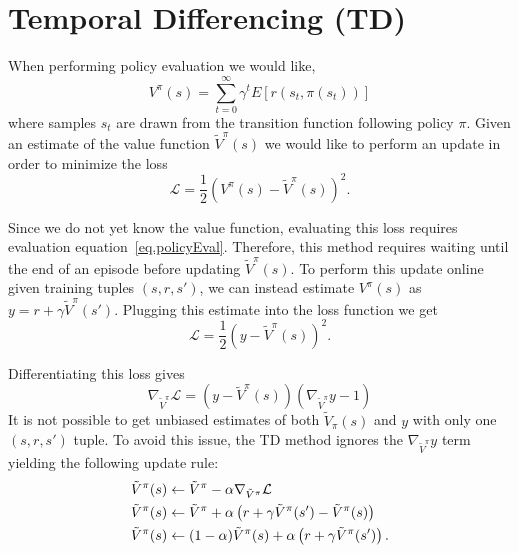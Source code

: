 \documentclass[11pt]{article}
\numberwithin{equation}{section}
\numberwithin{figure}{section}
\begin{document}
\section{Temporal Differencing (TD)}

When performing policy evaluation we would like,
\begin{equation}
	V^\pi(s) = \sum_{t = 0}^\infty \gamma^t E[r(s_t,\pi(s_t))]
	\label{eq.policyEval}
\end{equation}
where samples $s_t$ are drawn from the transition function following policy $\pi$. Given an estimate of the value function $\tilde{V}^\pi(s)$ we would like to perform an update in order to minimize the loss
\begin{equation}
	\mathcal{L} = \frac{1}{2} \left(V^\pi(s) - \tilde{V}^\pi(s) \right)^2.
	\label{eq.valLoss}
\end{equation}

Since we do not yet know the value function, evaluating this loss requires evaluation equation~\ref{eq.policyEval}. Therefore, this method requires waiting until the end of an episode before updating $\tilde{V}^\pi(s)$. To perform this update online given training tuples $(s,r,s')$, we can instead estimate $V^\pi(s)$ as $y = r + \gamma \tilde{V}^\pi(s')$. Plugging this estimate into the loss function we get
\begin{equation}
	\mathcal{L} = \frac{1}{2} \left(y - \tilde{V}^\pi(s) \right)^2.
	\label{eq.valLossApprox}
\end{equation}

Differentiating this loss gives
\begin{equation}
    \nabla_{\tilde{V}^\pi}\mathcal{L} = \left(y - \tilde{V}^\pi(s) \right) \left(\nabla_{\tilde{V}^\pi} y - 1 \right)
    \label{eq.valGrad}
\end{equation}
It is not possible to get unbiased estimates of both $\tilde{V}_\pi(s)$ and $y$ with only one $(s,r,s')$ tuple. To avoid this issue, the TD method ignores the $\nabla_{\tilde{V}^\pi} y$ term yielding the following update rule:
\begin{align}
    \tilde{V}^\pi(s) &\leftarrow  \tilde{V}^\pi - \alpha \nabla_{\tilde{V}^\pi}\mathcal{L} \notag \\
    \tilde{V}^\pi(s) &\leftarrow  \tilde{V}^\pi + \alpha \left(r + \gamma \tilde{V}^\pi(s') - \tilde{V}^\pi(s) \right) \notag \\
    \tilde{V}^\pi(s) &\leftarrow  (1 - \alpha) \tilde{V}^\pi(s) + \alpha \left(r+ \gamma \tilde{V}^\pi(s') \right). 
    \label{eq.valUpdate}
\end{align}
\end{document}
